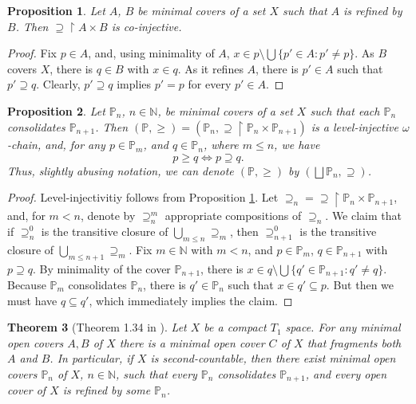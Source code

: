 \documentclass[12pt]{amsart}
\theoremstyle{plain}
\newtheorem{theorem}{Theorem}[section]
\newtheorem{proposition}[theorem]{\bf Proposition}
\newcommand \uhr{\upharpoonright}
\newcommand \NN{\mathbb{N}}
\newcommand \PPb{\mathbb{P}}
\begin{document}
\begin{proposition}
\label{pr:MinCoversCoInj}
Let $A$, $B$ be minimal covers of a set $X$ such that $A$ is refined by $B$. Then $\supseteq \uhr A \times B$ is co-injective. 
\end{proposition}

\begin{proof}
Fix $p \in A$, and, using minimality of $A$, $x \in  p \setminus \bigcup \{p' \in A: p' \neq p \}$. As  $B$ covers $X$, there is $q \in B$  with $x \in q$. As it refines $A$, there is $p' \in A$ such that $p' \supseteq q$. Clearly, $p' \supseteq q$ implies $p'=p$ for every $p' \in A$.
\end{proof}

\begin{proposition}
\label{pr:MinCoversChains}
Let $\PPb_n$, $n \in \NN$, be minimal covers of a set $X$ such that each $\PPb_n$ consolidates $\PPb_{n+1}$. Then $(\PPb,\geq)=(\PPb_n,\supseteq \uhr \PPb_n \times \PPb_{n+1})$  is a level-injective $\omega$-chain, and, for any $p \in \PPb_m$, and $q \in \PPb_n$, where $m \leq n$, we have
%
\[ p \geq q \iff p \supseteq q.\]
%
Thus, slightly abusing notation, we can denote $(\PPb,\geq)$ by $(\bigsqcup \PPb_n, \supseteq)$. 
\end{proposition}

\begin{proof}
Level-injectivitiy follows from Proposition \ref{pr:MinCoversCoInj}. Let $\supseteq_n=\supseteq \uhr \PPb_n \times \PPb_{n+1}$, and, for $m<n$, denote by $\supseteq^m_n$ appropriate compositions of $\supseteq_n$. We claim that if $\supseteq_n^0$ is the transitive closure of $\bigcup_{m \leq  n } \supseteq_m$, then $\supseteq_{n+1}^0$ is the transitive closure of $\bigcup_{m \leq n+1 } \supseteq_m$. Fix $m \in \NN$ with $m<n$, and $p \in \PPb_m$, $q \in \PPb_{n+1}$ with $p \supseteq q$. By minimality of the cover $\PPb_{n+1}$, there is $x \in q \setminus \bigcup \{q' \in \PPb_{n+1}: q' \neq q \}$. Because $\PPb_m$ consolidates $\PPb_n$, there is $q' \in \PPb_n$ such that $x \in q' \subseteq p$. But then we must have $q \subseteq q'$, which immediately implies the claim.
\end{proof}

\begin{theorem}[Theorem 1.34 in \cite{BaBiVi}]
	\label{th:CoinitialCapBasis}
	Let $X$ be a compact $T_1$ space. For any minimal open covers $A, B$ of $X$ there is a minimal open cover $C$ of $X$ that fragments both $A$ and $B$. In particular,  if $X$ is second-countable,  then there exist minimal open covers $\PPb_n$ of $X$, $n \in \NN$, such that every $\PPb_{n}$ consolidates $\PPb_{n+1}$, and every open cover of $X$ is refined by some $\PPb_n$. 
\end{theorem}
\end{document}
